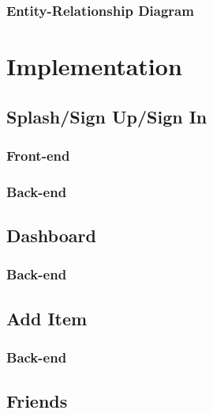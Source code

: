     \subsubsection{Entity-Relationship Diagram}
    \label{app:er}
    
    
    \section{Implementation}
    \subsection{Splash/Sign Up/Sign In}
    \subsubsection{Front-end}
    \label{app:facebook_login_frontend}
    
    \subsubsection{Back-end}
    \label{app:splash_signup_signin_backend}
    
    
    \subsection{Dashboard}
    \subsubsection{Back-end}
    \label{app:dashboard_backend}
    
    
    \subsection{Add Item}
    \subsubsection{Back-end}
    \label{app:add_item_backend}
    
    
    \subsection{Friends}
